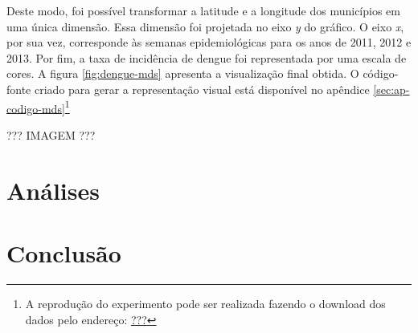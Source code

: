 \documentclass[12pt,openright,twoside,a4paper,article,brazil]{abntex2}
\begin{document}
Deste modo, foi possível transformar a latitude e a longitude dos municípios em uma única dimensão. Essa dimensão foi projetada no eixo \emph{y} do gráfico. O eixo \emph{x}, por sua vez, corresponde às semanas epidemiológicas para os anos de 2011, 2012 e 2013. Por fim, a taxa de incidência de dengue foi representada por uma escala de cores. A figura \ref{fig:dengue-mds} apresenta a visualização final obtida. O código-fonte criado para gerar a representação visual está disponível no apêndice \ref{sec:ap-codigo-mds}\footnote{A reprodução do experimento pode ser realizada fazendo o download dos dados pelo endereço: \url{???}}

??? IMAGEM ???





\section{Análises}
\label{sec:analises}



\section{Conclusão}
\label{sec:conclusao}



\backmatter

\postextual


\end{document}
